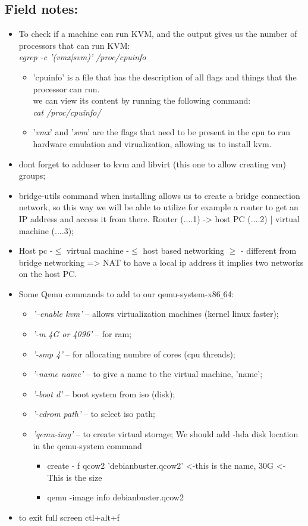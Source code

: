 \documentclass[11pt, a4paper, oneside]{article}
\theoremstyle{definition}
\begin{document}
\subsection{Field notes:}
\begin{itemize}
		\item To check if a machine can run KVM, and the output gives us the number of processors that can run KVM:\\
	 \textit{egrep -c '(vmx|svm)' /proc/cpuinfo}
	 	\begin{itemize}
	 		\item 'cpuinfo' is a file that has the description of all flags and things that the processor can run.\\
		we can view its content by running the following command:\\
		\textit{cat /proc/cpuinfo/}
			\item '\textit{vmx}' and '\textit{svm}' are the flags that need to be present in the cpu to run hardware emulation and virualization, allowing us to install kvm.
		\end{itemize}
		\item dont forget to adduser to kvm and libvirt (this one to allow creating vm) groups;
		\item bridge-utils command when installing allows us to create a bridge connection network, so this way we will be able to utilize for example a router to get an IP address and access it from there. Router (....1) -> host PC (....2) | virtual machine (....3);
		\item Host pc -$\leq$ virtual machine -$\leq$  host based networking $\geq$ - different from bridge networking => NAT to have a local ip address it implies two networks on the host PC.
		\item Some Qemu commands to add to our qemu-system-x86$\_$64:
		\begin{itemize}
			\item \textit{'--enable kvm'} -- allows virtualization machines (kernel linux faster);
			\item \textit{'-m 4G or 4096'} -- for ram;
			\item \textit{'-smp 4'} -- for allocating numbre of cores (cpu threads);
			\item \textit{'-name {name}'} -- to give a name to the virtual machine, 'name';
			\item \textit{'-boot d'} -- boot system from iso (disk);
			\item \textit{'-cdrom {path}'} -- to select iso path;
			\item \textit{'qemu-img'} -- to create virtual storage;
			We should add -hda disk location in the qemu-system command
			\begin{itemize}
			\item create - f qcow2 'debianbuster.qcow2' <-this is the name, 30G <- This is the size
				\item qemu -image info debianbuster.qcow2
			\end{itemize}
			
		\end{itemize}
		\item to exit full screen ctl+alt+f
\end{itemize}	
\end{document}
